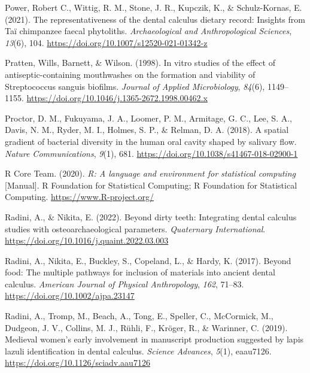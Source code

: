 \documentclass[
  letterpaper,
]{book}
\newlength{\cslhangindent}
\newlength{\cslentryspacingunit} %
\newenvironment{CSLReferences}[2] %
 {%
  \setlength{\parindent}{0pt}
  \ifodd #1
  \let\oldpar\par
  \def\par{\hangindent=\cslhangindent\oldpar}
  \fi
  \setlength{\parskip}{#2\cslentryspacingunit}
 }%
 {}
\begin{document}
\begin{CSLReferences}{1}{0}
\leavevmode{}%
Power, Robert C., Wittig, R. M., Stone, J. R., Kupczik, K., \&
Schulz-Kornas, E. (2021). The representativeness of the dental calculus
dietary record: Insights from {Taï} chimpanzee faecal phytoliths.
\emph{Archaeological and Anthropological Sciences}, \emph{13}(6), 104.
\url{https://doi.org/10.1007/s12520-021-01342-z}

\leavevmode{}%
Pratten, Wills, Barnett, \& Wilson. (1998). In vitro studies of the
effect of antiseptic-containing mouthwashes on the formation and
viability of {Streptococcus} sanguis biofilms. \emph{Journal of Applied
Microbiology}, \emph{84}(6), 1149--1155.
\url{https://doi.org/10.1046/j.1365-2672.1998.00462.x}

\leavevmode{}%
Proctor, D. M., Fukuyama, J. A., Loomer, P. M., Armitage, G. C., Lee, S.
A., Davis, N. M., Ryder, M. I., Holmes, S. P., \& Relman, D. A. (2018).
A spatial gradient of bacterial diversity in the human oral cavity
shaped by salivary flow. \emph{Nature Communications}, \emph{9}(1), 681.
\url{https://doi.org/10.1038/s41467-018-02900-1}

\leavevmode{}%
R Core Team. (2020). \emph{R: {A} language and environment for
statistical computing} {[}Manual{]}. {R Foundation for Statistical
Computing}; {R Foundation for Statistical Computing}.
\url{https://www.R-project.org/}

\leavevmode{}%
Radini, A., \& Nikita, E. (2022). Beyond dirty teeth: {Integrating}
dental calculus studies with osteoarchaeological parameters.
\emph{Quaternary International}.
\url{https://doi.org/10.1016/j.quaint.2022.03.003}

\leavevmode{}%
Radini, A., Nikita, E., Buckley, S., Copeland, L., \& Hardy, K. (2017).
Beyond food: {The} multiple pathways for inclusion of materials into
ancient dental calculus. \emph{American Journal of Physical
Anthropology}, \emph{162}, 71--83.
\url{https://doi.org/10.1002/ajpa.23147}

\leavevmode{}%
Radini, A., Tromp, M., Beach, A., Tong, E., Speller, C., McCormick, M.,
Dudgeon, J. V., Collins, M. J., Rühli, F., Kröger, R., \& Warinner, C.
(2019). Medieval women's early involvement in manuscript production
suggested by lapis lazuli identification in dental calculus.
\emph{Science Advances}, \emph{5}(1), eaau7126.
\url{https://doi.org/10.1126/sciadv.aau7126}


\end{CSLReferences}
\end{document}
